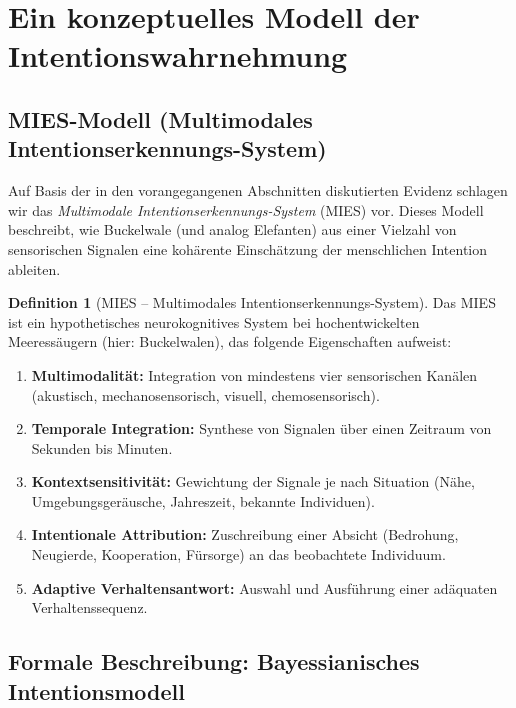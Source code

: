 ﻿\documentclass[12pt,a4paper]{article}
\theoremstyle{definition}
\newtheorem{definition}{Definition}[section]
\theoremstyle{remark}
\begin{document}
\section{Ein konzeptuelles Modell der Intentionswahrnehmung}
\label{sec:modell}

\subsection{MIES-Modell (Multimodales Intentionserkennungs-System)}

Auf Basis der in den vorangegangenen Abschnitten diskutierten Evidenz
schlagen wir das \emph{Multimodale Intentionserkennungs-System} (MIES) vor.
Dieses Modell beschreibt, wie Buckelwale (und analog Elefanten) aus einer
Vielzahl von sensorischen Signalen eine kohärente Einschätzung der menschlichen
Intention ableiten.

\begin{definition}[MIES -- Multimodales Intentionserkennungs-System]
  Das MIES ist ein hypothetisches neurokognitives System bei hochentwickelten
  Meeressäugern (hier: Buckelwalen), das folgende Eigenschaften aufweist:
  \begin{enumerate}[label=(\roman*)]
    \item \textbf{Multimodalität:} Integration von mindestens vier sensorischen
          Kanälen (akustisch, mechanosensorisch, visuell, chemosensorisch).
    \item \textbf{Temporale Integration:} Synthese von Signalen über einen
          Zeitraum von Sekunden bis Minuten.
    \item \textbf{Kontextsensitivität:} Gewichtung der Signale je nach
          Situation (Nähe, Umgebungsgeräusche, Jahreszeit, bekannte Individuen).
    \item \textbf{Intentionale Attribution:} Zuschreibung einer Absicht
          (Bedrohung, Neugierde, Kooperation, Fürsorge) an das beobachtete Individuum.
    \item \textbf{Adaptive Verhaltensantwort:} Auswahl und Ausführung einer
          adäquaten Verhaltenssequenz.
  \end{enumerate}
\end{definition}

\subsection{Formale Beschreibung: Bayessianisches Intentionsmodell}
\end{document}
